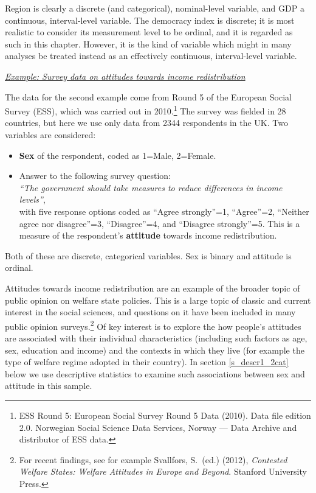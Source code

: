 Region is clearly a discrete (and categorical), nominal-level variable,
and GDP a continuous, interval-level variable. The democracy index is
discrete; it is most realistic to consider its measurement level to be
ordinal, and it is regarded as such in this chapter. However, it is the
kind of variable which might in many analyses be treated instead
as an effectively continuous, interval-level variable.

\underline{\emph{Example: Survey data on attitudes towards income redistribution}}
\label{p_ess_example}

The data for the second example come from Round 5 of the European Social
Survey (ESS), which was carried out in 2010.\footnote{ESS Round 5:
European Social Survey Round 5 Data (2010). Data file edition 2.0.
Norwegian Social Science Data Services, Norway --- Data Archive and
distributor of ESS data.} The survey was fielded in 28 countries, but
here we use only data from 2344 respondents in the UK. Two variables are
considered:
\begin{itemize}
\item
\textbf{Sex} of the respondent, coded as 1=Male, 2=Female.
\item
Answer to the following survey question:\\[.5ex]
\hspace*{1em}\emph{``The government should
take measures to reduce differences in income levels''},\\[.5ex]
with five response
options coded as ``Agree strongly''=1, ``Agree''=2, ``Neither agree nor
disagree''=3, ``Disagree''=4, and ``Disagree strongly''=5. This is a
measure of the respondent's \textbf{attitude} towards  income
redistribution.
\end{itemize}
Both of these are discrete, categorical variables. Sex is
binary and attitude is ordinal.

Attitudes towards income redistribution are an example of the broader
topic of public opinion on welfare state policies. This is a large topic
of classic and current interest in the social sciences, and questions on
it have been included in many public opinion surveys.\footnote{For
recent findings, see for example Svallfors, S.\ (ed.) (2012),
\emph{Contested Welfare States: Welfare Attitudes in Europe and Beyond}.
Stanford University Press.} Of key interest is to explore the
how people's attitudes are associated with their individual
characteristics (including such factors as age, sex, education and
income) and the contexts in which they live (for example the type
of welfare regime adopted in their country). In section
\ref{s_descr1_2cat} below we use descriptive statistics to examine
such associations between sex and attitude in this sample.


